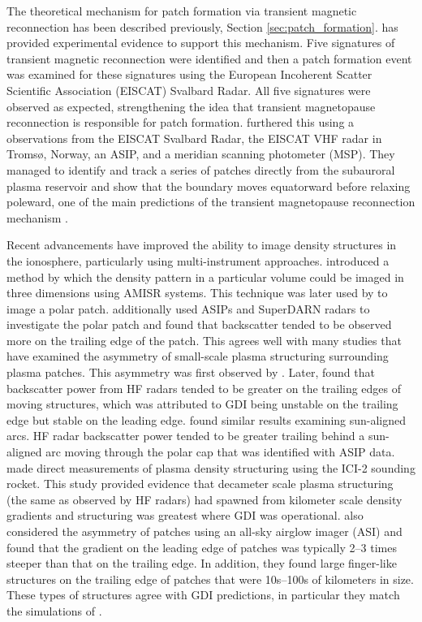 The theoretical mechanism for patch formation via transient magnetic reconnection has been described previously, Section \ref{sec:patch_formation}.  \citet{Carlson2004} has provided experimental evidence to support this mechanism.  Five signatures of transient magnetic reconnection were identified and then a patch formation event was examined for these signatures using the European Incoherent Scatter Scientific Association (EISCAT) Svalbard Radar.  All five signatures were observed as expected, strengthening the idea that transient magnetopause reconnection is responsible for patch formation.  \citet{Carlson2006} furthered this using a observations from the EISCAT Svalbard Radar, the EISCAT VHF radar in Troms\o, Norway, an ASIP, and a meridian scanning photometer (MSP).  They managed to identify and track a series of patches directly from the subauroral plasma reservoir and show that the boundary moves equatorward before relaxing poleward, one of the main predictions of the transient magnetopause reconnection mechanism \citep{Lockwood1992b}.

Recent advancements have improved the ability to image density structures in the ionosphere, particularly using multi-instrument approaches.  \citet{Semeter2009} introduced a method by which the density pattern in a particular volume could be imaged in three dimensions using AMISR systems.  This technique was later used by \citet{Dahlgren2012a,Dahlgren2012b} to image a polar patch.  \citet{Dahlgren2012b} additionally used ASIPs and SuperDARN radars to investigate the polar patch and found that backscatter tended to be observed more on the trailing edge of the patch.  This agrees well with many studies that have examined the asymmetry of small-scale plasma structuring surrounding plasma patches.  This asymmetry was first observed by \citet{Weber1984}.  Later, \citet{Milan2002b} found that backscatter power from HF radars tended to be greater on the trailing edges of moving structures, which was attributed to GDI being unstable on the trailing edge but stable on the leading edge.  \citet{Koustov2012} found similar results examining sun-aligned arcs.  HF radar backscatter power tended to be greater trailing behind a sun-aligned arc moving through the polar cap that was identified with ASIP data.  \citet{Moen2012} made direct measurements of plasma density structuring using the ICI-2 sounding rocket.  This study provided evidence that decameter scale plasma structuring (the same as observed by HF radars) had spawned from kilometer scale density gradients and structuring was greatest where GDI was operational.  \citet{Hosokawa2016} also considered the asymmetry of patches using an all-sky airglow imager (ASI) and found that the gradient on the leading edge of patches was typically 2--3 times steeper than that on the trailing edge.  In addition, they found large finger-like structures on the trailing edge of patches that were 10s--100s of kilometers in size.  These types of structures agree with GDI predictions, in particular they match the simulations of \citet{Gondarenko2004}.



